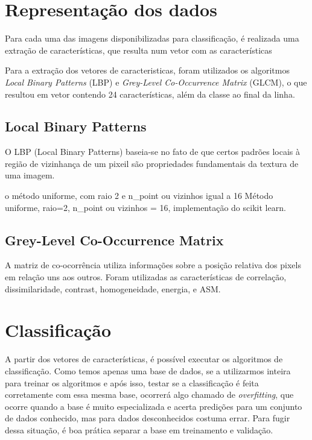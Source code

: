 \documentclass[conference]{IEEEtran}
\begin{document}
\section{Representação dos dados}

Para cada uma das imagens disponibilizadas para classificação, é realizada uma
extração de características, que resulta num vetor com as características

Para a extração dos vetores de caracteristicas, foram utilizados os algoritmos
\emph{Local Binary Patterns} (LBP) e \emph{Grey-Level Co-Occurrence Matrix}
(GLCM), o que resultou em vetor contendo 24 características, além da classe ao
final da linha.

\subsection{Local Binary Patterns}

O LBP (Local Binary Patterns) baseia-se no fato de que certos padrões locais à
região de vizinhança de um pixeil são propriedades fundamentais da textura de
uma imagem.

o método uniforme, com raio 2 e n\_point ou vizinhos igual a 16
Método uniforme, raio=2, n\_point ou vizinhos = 16,
implementação do scikit learn.

\subsection{Grey-Level Co-Occurrence Matrix}

A matriz de co-ocorrência utiliza informações sobre a posição relativa dos
pixels em relação uns aos outros. Foram utilizadas as características de
correlação, dissimilaridade, contrast, homogeneidade, energia, e ASM.

\section{Classificação}

A partir dos vetores de características, é possível executar os
algoritmos de classificação. Como temos apenas uma base de dados, se a
utilizarmos inteira para treinar os algoritmos e após isso, testar se a
classificação é feita corretamente com essa mesma base, ocorrerá algo chamado de
\emph{overfitting}, que ocorre quando a base é muito especializada e acerta predições
para um conjunto de dados conhecido, mas para dados desconhecidos costuma errar.
Para fugir dessa situação, é boa prática separar a base em treinamento e
validação.
\end{document}
